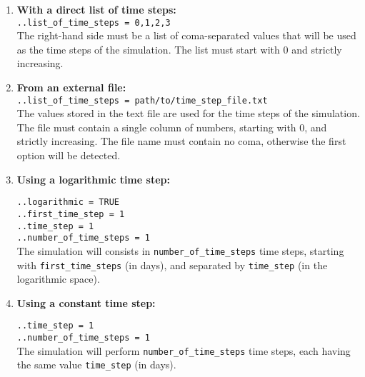 \documentclass[10pt]{article}
\begin{document}
\begin{enumerate}
	\item \textbf{With a direct list of time steps:}\\

	\noindent \verb+..list_of_time_steps = 0,1,2,3+ \\	

	The right-hand side must be a list of coma-separated values that will be used as the time steps of the simulation.
	The list must start with 0 and strictly increasing.\\

	\eject

	\item \textbf{From an external file:}\\
	
	\noindent \verb+..list_of_time_steps = path/to/time_step_file.txt+ \\	
	
	The values stored in the text file are used for the time steps of the simulation. 
	The file must contain a single column of numbers, starting with 0, and strictly increasing.
	The file name must contain no coma, otherwise the first option will be detected.
	
	\item \textbf{Using a logarithmic time step:\\} 

	\noindent \verb+..logarithmic = TRUE+ \\	
	\verb+..first_time_step = 1+\\
	\verb+..time_step = 1+\\
	\verb+..number_of_time_steps = 1+\\

	The simulation will consists in \verb+number_of_time_steps+ time steps, starting with \verb+first_time_steps+ (in days), and separated by \verb+time_step+ (in the logarithmic space).
	
	\item \textbf{Using a constant time step:\\}

	\noindent \verb+..time_step = 1+\\
	\verb+..number_of_time_steps = 1+\\

	The simulation will perform \verb+number_of_time_steps+ time steps, each having the same value \verb+time_step+ (in days).

\end{enumerate}
\end{document}
